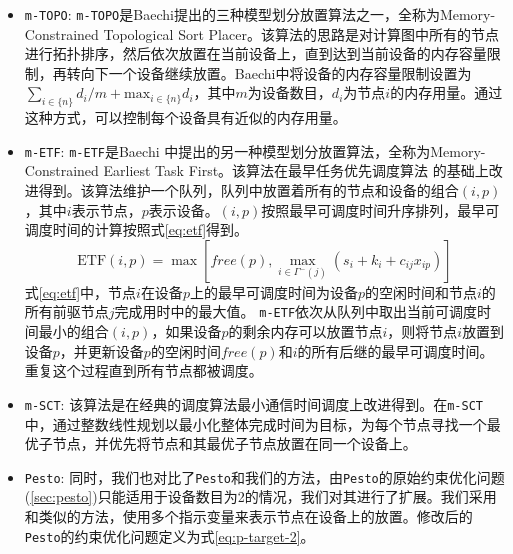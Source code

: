 \begin{itemize}
	\item \texttt{m-TOPO}: \texttt{m-TOPO}是Baechi提出的三种模型划分放置算法之一，全称为Memory-Constrained Topological Sort Placer。该算法的思路是对计算图中所有的节点进行拓扑排序，然后依次放置在当前设备上，直到达到当前设备的内存容量限制，再转向下一个设备继续放置。Baechi中将设备的内存容量限制设置为$\sum_{i\in\{n\}}d_i / m + \mathrm{max}_{i\in\{n\}} d_i$，其中$m$为设备数目，$d_i$为节点$i$的内存用量。通过这种方式，可以控制每个设备具有近似的内存用量。
	\item \texttt{m-ETF}: \texttt{m-ETF}是Baechi 中提出的另一种模型划分放置算法，全称为Memory-Constrained Earliest Task First。该算法在最早任务优先调度算法 的基础上改进得到。该算法维护一个队列，队列中放置着所有的节点和设备的组合$(i,p)$，其中$i$表示节点，$p$表示设备。$(i,p)$按照最早可调度时间升序排列，最早可调度时间的计算按照式\ref{eq:etf}得到。
	\begin{equation}
		\label{eq:etf}
		\mathrm{ETF}(i,p) = \max\left[\mathit{free(p)}, \max_{i\in \Gamma^- (j)}(s_i+k_i+c_{ij}x_{ip}) \right]
	\end{equation}
	式\ref{eq:etf}中，节点$i$在设备$p$上的最早可调度时间为设备$p$的空闲时间和节点$i$的所有前驱节点$j$完成用时中的最大值。
	\texttt{m-ETF}依次从队列中取出当前可调度时间最小的组合$(i,p)$，如果设备$p$的剩余内存可以放置节点$i$，则将节点$i$放置到设备$p$，并更新设备$p$的空闲时间$\mathit{free}(p)$和$i$的所有后继的最早可调度时间。重复这个过程直到所有节点都被调度。

	\item \texttt{m-SCT}: 该算法是在经典的调度算法最小通信时间调度上改进得到。在\texttt{m-SCT}中，通过整数线性规划以最小化整体完成时间为目标，为每个节点寻找一个最优子节点，并优先将节点和其最优子节点放置在同一个设备上。
	\item \texttt{Pesto}: 同时，我们也对比了\texttt{Pesto}和我们的方法，由\texttt{Pesto}的原始约束优化问题(\ref{sec:pesto})只能适用于设备数目为2的情况，我们对其进行了扩展。我们采用和\sys{}类似的方法，使用多个指示变量来表示节点在设备上的放置。修改后的\texttt{Pesto}的约束优化问题定义为式\ref{eq:p-target-2}。
\end{itemize}

